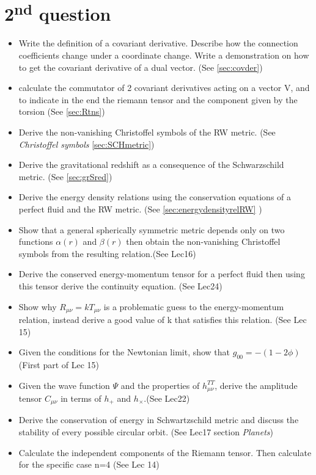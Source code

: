 \section{2\textsuperscript{nd} question}

\begin{itemize}
	\item Write the definition of a covariant derivative. Describe how the connection coefficients change under a coordinate change. Write a demonstration on how to get the covariant derivative of a dual vector. (See \ref{sec:covder})
	\item calculate the commutator of 2 covariant derivatives acting on a vector V, and to indicate in the end the riemann tensor and the component given by the torsion (See \ref{sec:Rtns})
	\item Derive the non-vanishing Christoffel symbols of the RW metric. (See \emph{Christoffel symbols} \ref{sec:SCHmetric})
	\item Derive the gravitational redshift as a consequence of the Schwarzschild metric. (See \ref{sec:grSred})
	\item Derive the energy density relations using the conservation equations of a perfect fluid and the RW metric. (See \ref{sec:energydensityrelRW} )
\item Show that a general spherically symmetric metric depends only on two functions $\alpha \left( r \right)$ and $\beta \left( r \right)$ then obtain the non-vanishing Christoffel symbols from the resulting relation.(See Lec16)
\item Derive the conserved energy-momentum tensor for a perfect fluid then using this tensor derive the continuity equation. (See Lec24)
\item Show why $R_{\mu \nu } = k T_{\mu \nu }$ is a problematic guess to the energy-momentum relation, instead derive a good value of k that satisfies this relation. (See Lec 15)
\item Given the conditions for the Newtonian limit, show that $g_{00 } = - \left( 1-2\phi  \right) $ (First part of Lec 15)
\item Given the wave function $\Psi $ and the properties of $h^{TT}_{\mu \nu }$, derive the amplitude tensor $C_{\mu \nu }$ in terms of $h_{+}$ and $h_{\times}$.(See Lec22)
\item Derive the conservation of energy in Schwartzschild metric and discuss the stability of every possible circular orbit. (See Lec17 section \emph{Planets})
\item Calculate the independent components of the Riemann tensor. Then calculate for the specific case n=4 (See Lec 14)

\end{itemize}
